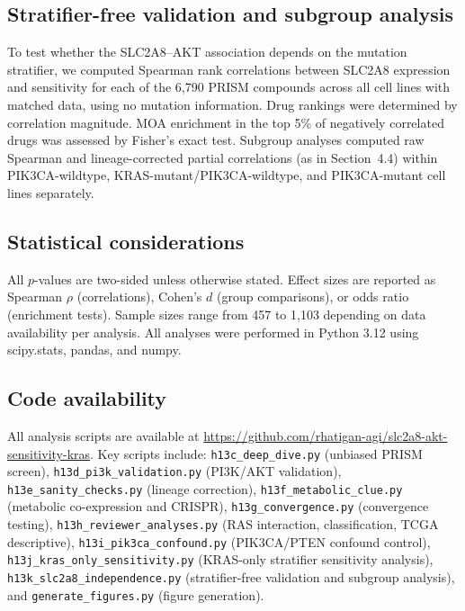 \documentclass[12pt]{article}
\begin{document}
\subsection{Stratifier-free validation and subgroup analysis}

To test whether the SLC2A8--AKT association depends on the mutation
stratifier, we computed Spearman rank correlations between SLC2A8
expression and sensitivity for each of the 6,790 PRISM compounds across
all cell lines with matched data, using no mutation information.
Drug rankings were determined by correlation magnitude. MOA enrichment
in the top 5\% of negatively correlated drugs was assessed by Fisher's
exact test. Subgroup analyses computed raw Spearman and lineage-corrected
partial correlations (as in Section~4.4) within PIK3CA-wildtype,
KRAS-mutant/PIK3CA-wildtype, and PIK3CA-mutant cell lines separately.

\subsection{Statistical considerations}

All $p$-values are two-sided unless otherwise stated. Effect sizes are
reported as Spearman $\rho$ (correlations), Cohen's $d$ (group
comparisons), or odds ratio (enrichment tests). Sample sizes range from
457 to 1,103 depending on data availability per analysis. All analyses
were performed in Python 3.12 using scipy.stats, pandas, and numpy.

\subsection{Code availability}

\begin{sloppypar}
All analysis scripts are available at
\url{https://github.com/rhatigan-agi/slc2a8-akt-sensitivity-kras}.
Key scripts include: \texttt{h13c\_deep\_dive.py} (unbiased PRISM screen),
\texttt{h13d\_pi3k\_validation.py} (PI3K/AKT validation),
\texttt{h13e\_sanity\_checks.py} (lineage correction),
\texttt{h13f\_metabolic\_clue.py} (metabolic co-expression and CRISPR),
\texttt{h13g\_convergence.py} (convergence testing),
\texttt{h13h\_reviewer\_analyses.py} (RAS interaction, classification,
TCGA descriptive), \texttt{h13i\_pik3ca\_confound.py} (PIK3CA/PTEN
confound control), \texttt{h13j\_kras\_only\_sensitivity.py} (KRAS-only
stratifier sensitivity analysis), \texttt{h13k\_slc2a8\_independence.py}
(stratifier-free validation and subgroup analysis), and
\texttt{generate\_figures.py} (figure generation).
\end{sloppypar}
\end{document}
